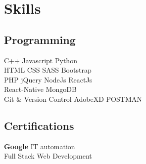 \documentclass[]{deedy-resume-openfont}
\begin{document}
\begin{minipage}[t]{0.33\textwidth}

\section{Skills}
\subsection{Programming}
\vspace{\topsep}
\textbullet{}   C++ \textbullet{} Javascript \textbullet{} Python \\
\vspace{\topsep}
\textbullet{} HTML \textbullet{} CSS \textbullet{} SASS \textbullet{} Bootstrap\\ \textbullet{} PHP
\textbullet{} jQuery \textbullet{} NodeJs \textbullet{} ReactJs \\
\textbullet{} React-Native \textbullet{} MongoDB \\
\vspace{\topsep}
 \textbullet{} Git \& Version Control \textbullet{} AdobeXD \textbullet{} POSTMAN
\sectionsep

\subsection{Certifications}
\textbullet{} \textbf{Google} IT automation \\
\textbullet{} Full Stack Web Development
\sectionsep

%
%

\end{minipage} 
\hfill
\end{document}
